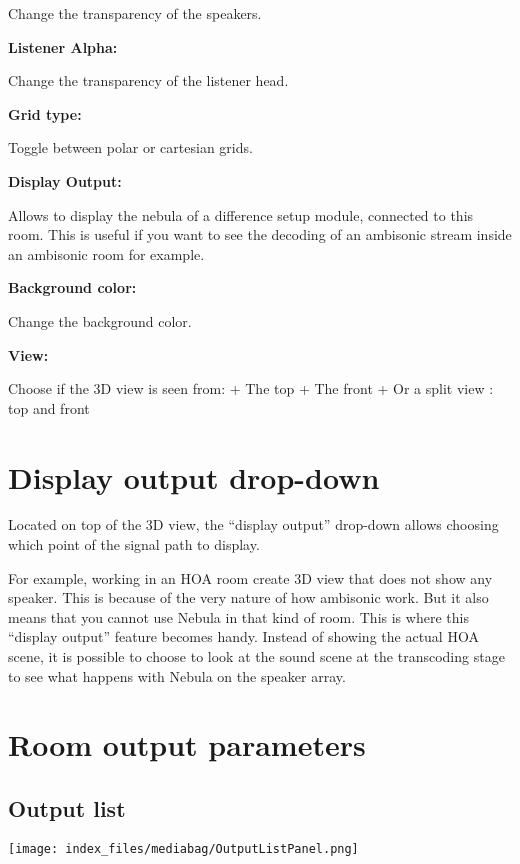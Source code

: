 \documentclass[
  letterpaper,
  DIV=11,
  numbers=noendperiod]{scrreport}
\begin{document}
Change the transparency of the speakers.

\textbf{Listener Alpha:}

Change the transparency of the listener head.

\textbf{Grid type:}

Toggle between polar or cartesian grids.

\textbf{Display Output:}

Allows to display the nebula of a difference setup module, connected to
this room. This is useful if you want to see the decoding of an
ambisonic stream inside an ambisonic room for example.

\textbf{Background color:}

Change the background color.

\textbf{View:}

Choose if the 3D view is seen from: + The top + The front + Or a split
view : top and front

\hypertarget{display-output-drop-down}{%
\section{Display output drop-down}\label{display-output-drop-down}}

Located on top of the 3D view, the ``display output'' drop-down allows
choosing which point of the signal path to display.

For example, working in an HOA room create 3D view that does not show
any speaker. This is because of the very nature of how ambisonic work.
But it also means that you cannot use Nebula in that kind of room. This
is where this ``display output'' feature becomes handy. Instead of
showing the actual HOA scene, it is possible to choose to look at the
sound scene at the transcoding stage to see what happens with Nebula on
the speaker array.

\hypertarget{room-output-parameters}{%
\section{Room output parameters}\label{room-output-parameters}}

\hypertarget{output-list}{%
\subsection{Output list}\label{output-list}}

\texttt{[image: index\_files/mediabag/OutputListPanel.png]}
\end{document}
